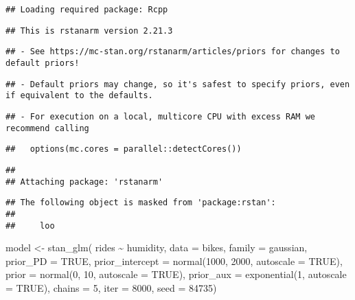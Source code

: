 \documentclass[
]{article}
\newenvironment{Shaded}{\begin{snugshade}}{\end{snugshade}}
\newcommand{\AttributeTok}[1]{\textcolor[rgb]{0.77,0.63,0.00}{#1}}
\newcommand{\ConstantTok}[1]{\textcolor[rgb]{0.00,0.00,0.00}{#1}}
\newcommand{\DecValTok}[1]{\textcolor[rgb]{0.00,0.00,0.81}{#1}}
\newcommand{\FunctionTok}[1]{\textcolor[rgb]{0.00,0.00,0.00}{#1}}
\newcommand{\NormalTok}[1]{#1}
\newcommand{\OtherTok}[1]{\textcolor[rgb]{0.56,0.35,0.01}{#1}}
\newcommand{\SpecialCharTok}[1]{\textcolor[rgb]{0.00,0.00,0.00}{#1}}
\begin{document}
\begin{verbatim}
## Loading required package: Rcpp
\end{verbatim}

\begin{verbatim}
## This is rstanarm version 2.21.3
\end{verbatim}

\begin{verbatim}
## - See https://mc-stan.org/rstanarm/articles/priors for changes to default priors!
\end{verbatim}

\begin{verbatim}
## - Default priors may change, so it's safest to specify priors, even if equivalent to the defaults.
\end{verbatim}

\begin{verbatim}
## - For execution on a local, multicore CPU with excess RAM we recommend calling
\end{verbatim}

\begin{verbatim}
##   options(mc.cores = parallel::detectCores())
\end{verbatim}

\begin{verbatim}
## 
## Attaching package: 'rstanarm'
\end{verbatim}

\begin{verbatim}
## The following object is masked from 'package:rstan':
## 
##     loo
\end{verbatim}

\begin{Shaded}
\begin{Highlighting}[]
\NormalTok{model }\OtherTok{\textless{}{-}} \FunctionTok{stan\_glm}\NormalTok{(}
\NormalTok{  rides }\SpecialCharTok{\textasciitilde{}}\NormalTok{ humidity, }\AttributeTok{data =}\NormalTok{ bikes, }
  \AttributeTok{family =}\NormalTok{ gaussian,}
  \AttributeTok{prior\_PD =} \ConstantTok{TRUE}\NormalTok{,}
  \AttributeTok{prior\_intercept =} \FunctionTok{normal}\NormalTok{(}\DecValTok{1000}\NormalTok{, }\DecValTok{2000}\NormalTok{, }\AttributeTok{autoscale =} \ConstantTok{TRUE}\NormalTok{),}
  \AttributeTok{prior =} \FunctionTok{normal}\NormalTok{(}\DecValTok{0}\NormalTok{, }\DecValTok{10}\NormalTok{, }\AttributeTok{autoscale =} \ConstantTok{TRUE}\NormalTok{), }
  \AttributeTok{prior\_aux =} \FunctionTok{exponential}\NormalTok{(}\DecValTok{1}\NormalTok{, }\AttributeTok{autoscale =} \ConstantTok{TRUE}\NormalTok{),}
  \AttributeTok{chains =} \DecValTok{5}\NormalTok{, }\AttributeTok{iter =} \DecValTok{8000}\NormalTok{, }\AttributeTok{seed =} \DecValTok{84735}\NormalTok{)}
\end{Highlighting}
\end{Shaded}
\end{document}
